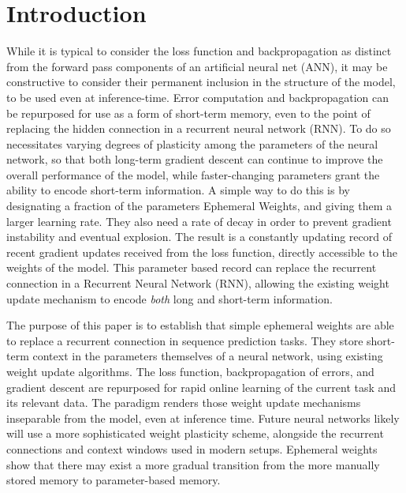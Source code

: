 \documentclass{article} %
\begin{document}
\section{Introduction}

While it is typical to consider the loss function and backpropagation as distinct from the forward pass components of an artificial neural net (ANN), it may be constructive to consider their permanent inclusion in the structure of the model, to be used even at inference-time. Error computation and backpropagation can be repurposed for use as a form of short-term memory, even to the point of replacing the hidden connection in a recurrent neural network (RNN). To do so necessitates varying degrees of plasticity among the parameters of the neural network, so that both long-term gradient descent can continue to improve the overall performance of the model, while faster-changing parameters grant the ability to encode short-term information. A simple way to do this is by designating a fraction of the parameters Ephemeral Weights, and giving them a larger learning rate. They also need a rate of decay in order to prevent gradient instability and eventual explosion. The result is a constantly updating record of recent gradient updates received from the loss function, directly accessible to the weights of the model. This parameter based record can replace the recurrent connection in a Recurrent Neural Network (RNN), allowing the existing weight update mechanism to encode \emph{both} long and short-term information.

The purpose of this paper is to establish that simple ephemeral weights are able to replace a recurrent connection in sequence prediction tasks. They store short-term context in the parameters themselves of a neural network, using existing weight update algorithms. The loss function, backpropagation of errors, and gradient descent are repurposed for rapid online learning of the current task and its relevant data. The paradigm renders those weight update mechanisms inseparable from the model, even at inference time. Future neural networks likely will use a more sophisticated weight plasticity scheme, alongside the recurrent connections and context windows used in modern setups. Ephemeral weights show that there may exist a more gradual transition from the more manually stored memory to parameter-based memory.
\end{document}
